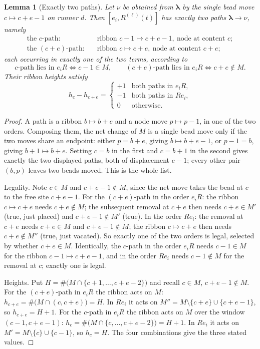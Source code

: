 \documentclass[11pt]{article}
\newtheorem{lemma}[theorem]{Lemma}
\theoremstyle{definition}
\theoremstyle{remark}
\newcommand{\bl}{\boldsymbol{\lambda}}
\begin{document}
\begin{lemma}[Exactly two paths]\label{lem:paths}
Let $\nu$ be obtained from $\bl$ by the single bead move $c\mapsto c+e-1$ on runner $d$.
Then $[e_i,R^{(\ell)}(t)]$ has exactly two paths $\bl\to\nu$, namely
\begin{align*}
\text{the $c$-path:}\quad &\text{ribbon }c-1\mapsto c+e-1,\ \text{node at content }c;\\
\text{the $(c+e)$-path:}\quad &\text{ribbon }c\mapsto c+e,\ \text{node at content }c+e;
\end{align*}
each occurring in exactly one of the two terms, according to
\[
\text{$c$-path lies in }e_iR \iff c-1\in M,\qquad
\text{$(c+e)$-path lies in }e_iR \iff c+e\notin M .
\]
Their ribbon heights satisfy
\[
h_c-h_{c+e}=\begin{cases} +1 & \text{both paths in } e_iR,\\
-1 & \text{both paths in } Re_i,\\ 0 & \text{otherwise.}\end{cases}
\]
\end{lemma}

\begin{proof}
A path is a ribbon $b\mapsto b+e$ and a node move $p\mapsto p-1$, in one of the two
orders. Composing them, the net change of $M$ is a single bead move only if the two
moves share an endpoint: either $p=b+e$, giving $b\mapsto b+e-1$, or $p-1=b$, giving
$b+1\mapsto b+e$. Setting $c=b$ in the first and $c=b+1$ in the second gives exactly the
two displayed paths, both of displacement $e-1$; every other pair $(b,p)$ leaves two
beads moved. This is the whole list.

Legality. Note $c\in M$ and $c+e-1\notin M$, since the net move takes the bead at $c$ to
the free site $c+e-1$. For the $(c+e)$-path in the order $e_iR$: the ribbon
$c\mapsto c+e$ needs $c+e\notin M$; the subsequent removal at $c+e$ then needs
$c+e\in M'$ (true, just placed) and $c+e-1\notin M'$ (true). In the order $Re_i$: the
removal at $c+e$ needs $c+e\in M$ and $c+e-1\notin M$; the ribbon $c\mapsto c+e$ then
needs $c+e\notin M''$ (true, just vacated). So exactly one of the two orders is legal,
selected by whether $c+e\in M$. Identically, the $c$-path in the order $e_iR$ needs
$c-1\in M$ for the ribbon $c-1\mapsto c+e-1$, and in the order $Re_i$ needs
$c-1\notin M$ for the removal at $c$; exactly one is legal.

Heights. Put $H=\#\big(M\cap\{c+1,\dots,c+e-2\}\big)$ and recall $c\in M$,
$c+e-1\notin M$.
For the $(c+e)$-path in $e_iR$ the ribbon acts on $M$:
$h_{c+e}=\#\big(M\cap(c,c+e)\big)=H$. In $Re_i$ it acts on
$M''=M\setminus\{c+e\}\cup\{c+e-1\}$, so $h_{c+e}=H+1$.
For the $c$-path in $e_iR$ the ribbon acts on $M$ over the window $(c-1,c+e-1)$:
$h_c=\#\big(M\cap\{c,\dots,c+e-2\}\big)=H+1$. In $Re_i$ it acts on
$M'=M\setminus\{c\}\cup\{c-1\}$, so $h_c=H$. The four combinations give the three stated
values.
\end{proof}
\end{document}
